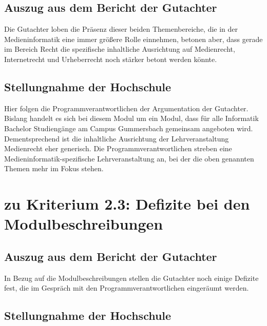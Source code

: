 \subsection{Auszug aus dem Bericht der
Gutachter}\label{auszug-aus-dem-bericht-der-gutachter-2}

\begin{siderules}
Die Gutachter loben die Präsenz dieser beiden Themenbereiche, die in der
Medieninformatik eine immer größere Rolle einnehmen, betonen aber, dass
gerade im Bereich Recht die spezifische inhaltliche Ausrichtung auf
Medienrecht, Internetrecht und Urheberrecht noch stärker betont werden
könnte.
\end{siderules}

\subsection{Stellungnahme der
Hochschule}\label{stellungnahme-der-hochschule-1}

Hier folgen die Programmverantwortlichen der Argumentation der
Gutachter. Bislang handelt es sich bei diesem Modul um ein Modul, dass
für alle Informatik Bachelor Studiengänge am Campus Gummersbach
gemeinsam angeboten wird. Dementsprechend ist die inhaltliche
Ausrichtung der Lehrveranstaltung Medienrecht eher generisch. Die
Programmverantwortlichen streben eine Medieninformatik-spezifische
Lehrveranstaltung an, bei der die oben genannten Themen mehr im Fokus
stehen.

\section{zu Kriterium 2.3: Defizite bei den
Modulbeschreibungen}\label{zu-kriterium-2.3-defizite-bei-den-modulbeschreibungen}

\subsection{Auszug aus dem Bericht der
Gutachter}\label{auszug-aus-dem-bericht-der-gutachter-3}

\begin{siderules}
In Bezug auf die Modulbeschreibungen stellen die Gutachter noch einige
Defizite fest, die im Gespräch mit den Programmverantwortlichen
eingeräumt werden.
\end{siderules}

\subsection{Stellungnahme der
Hochschule}\label{stellungnahme-der-hochschule-2}

